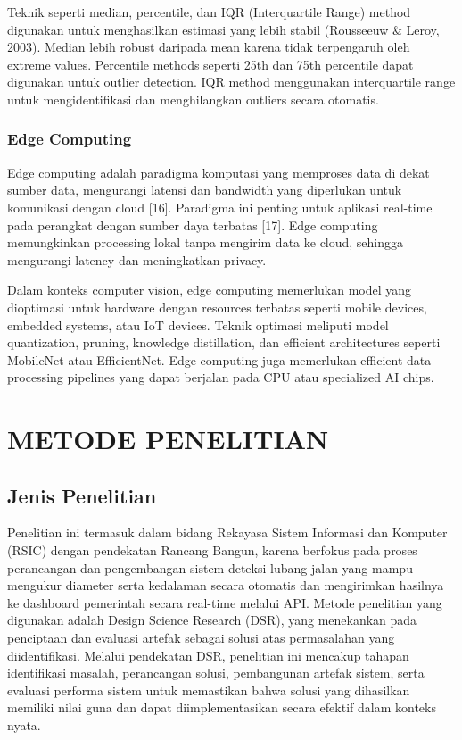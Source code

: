 \documentclass[12pt,a4paper]{report}
\begin{document}
Teknik seperti median, percentile, dan IQR (Interquartile Range) method digunakan untuk menghasilkan estimasi yang lebih stabil (Rousseeuw \& Leroy, 2003). Median lebih robust daripada mean karena tidak terpengaruh oleh extreme values. Percentile methods seperti 25th dan 75th percentile dapat digunakan untuk outlier detection. IQR method menggunakan interquartile range untuk mengidentifikasi dan menghilangkan outliers secara otomatis.

\subsection{Edge Computing}

Edge computing adalah paradigma komputasi yang memproses data di dekat sumber data, mengurangi latensi dan bandwidth yang diperlukan untuk komunikasi dengan cloud [16]. Paradigma ini penting untuk aplikasi real-time pada perangkat dengan sumber daya terbatas [17]. Edge computing memungkinkan processing lokal tanpa mengirim data ke cloud, sehingga mengurangi latency dan meningkatkan privacy.

Dalam konteks computer vision, edge computing memerlukan model yang dioptimasi untuk hardware dengan resources terbatas seperti mobile devices, embedded systems, atau IoT devices. Teknik optimasi meliputi model quantization, pruning, knowledge distillation, dan efficient architectures seperti MobileNet atau EfficientNet. Edge computing juga memerlukan efficient data processing pipelines yang dapat berjalan pada CPU atau specialized AI chips.

\chapter{METODE PENELITIAN}

\section{Jenis Penelitian}

Penelitian ini termasuk dalam bidang Rekayasa Sistem Informasi dan Komputer (RSIC) dengan pendekatan Rancang Bangun, karena berfokus pada proses perancangan dan pengembangan sistem deteksi lubang jalan yang mampu mengukur diameter serta kedalaman secara otomatis dan mengirimkan hasilnya ke dashboard pemerintah secara real-time melalui API. Metode penelitian yang digunakan adalah Design Science Research (DSR), yang menekankan pada penciptaan dan evaluasi artefak sebagai solusi atas permasalahan yang diidentifikasi. Melalui pendekatan DSR, penelitian ini mencakup tahapan identifikasi masalah, perancangan solusi, pembangunan artefak sistem, serta evaluasi performa sistem untuk memastikan bahwa solusi yang dihasilkan memiliki nilai guna dan dapat diimplementasikan secara efektif dalam konteks nyata.
\end{document}
